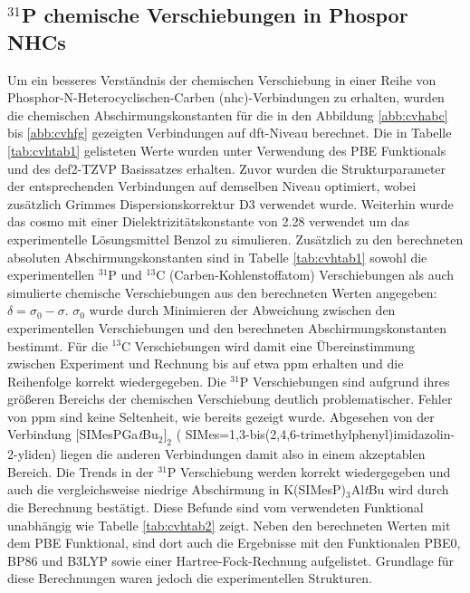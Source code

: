 \subsection{\texorpdfstring{$^{31}$P}{31P} chemische Verschiebungen in Phospor NHCs}
Um ein besseres Verständnis der chemischen Verschiebung in einer Reihe von Phosphor-N-Heterocyclischen-Carben (\acs{nhc})-Verbindungen \supercite{lemp2017nhc} zu erhalten, wurden die chemischen Abschirmungskonstanten für die in den Abbildung \ref{abb:cvhabc} bis \ref{abb:cvhfg} gezeigten Verbindungen auf \ac{dft}-Niveau berechnet. Die in Tabelle \ref{tab:cvhtab1} gelisteten Werte wurden unter Verwendung des PBE Funktionals\supercite{perdew1996generalized} und des def2-TZVP Basissatzes\supercite{weigend2005balanced} erhalten. Zuvor wurden die Strukturparameter der entsprechenden Verbindungen auf demselben Niveau optimiert, wobei zusätzlich Grimmes Dispersionskorrektur D3\supercite{grimme2010consistent,grimme2011effect} verwendet wurde. Weiterhin wurde das \ac{cosmo}\supercite{klamt1993cosmo} mit einer Dielektrizitätskonstante von 2.28 verwendet um das experimentelle Lösungsmittel Benzol zu simulieren. Zusätzlich zu den berechneten absoluten Abschirmungskonstanten sind in Tabelle \ref{tab:cvhtab1} sowohl die experimentellen $^{31}$P und $^{13}$C (Carben-Kohlenstoffatom) Verschiebungen als auch simulierte chemische Verschiebungen aus den berechneten Werten angegeben: $\delta=\sigma_0-\sigma$. $\sigma_0$ wurde durch Minimieren der Abweichung zwischen den experimentellen Verschiebungen und den berechneten Abschirmungskonstanten bestimmt. Für die $^{13}$C Verschiebungen wird damit eine Übereinstimmung zwischen Experiment und Rechnung bis auf etwa \unit[2]{ppm} erhalten und die Reihenfolge korrekt wiedergegeben. Die $^{31}$P Verschiebungen sind aufgrund ihres größeren Bereichs der chemischen Verschiebung deutlich problematischer. Fehler von \unit[30]{ppm} sind keine Seltenheit, wie bereits gezeigt wurde.\supercite{latypov2015quantum,reiter2017calculation} Abgesehen von der Verbindung $[$SIMesPGa\textit{t}Bu$_2]_2$ ( SIMes=1,3-bis(2,4,6-tri\-me\-thyl\-phe\-nyl)imi\-da\-zo\-lin-2-yli\-den) liegen die anderen Verbindungen damit also in einem akzeptablen Bereich. Die Trends in der $^{31}$P Verschiebung werden korrekt wiedergegeben und auch die vergleichsweise niedrige Abschirmung in K(SIMesP)$_3$Al\textit{t}Bu wird durch die Berechnung bestätigt. Diese Befunde sind vom verwendeten Funktional unabhängig wie Tabelle \ref{tab:cvhtab2} zeigt. Neben den berechneten Werten mit dem PBE Funktional, sind dort auch die Ergebnisse mit den Funktionalen PBE0\supercite{adamo1999toward}, BP86\supercite{perdew1986density,becke1988density} und B3LYP\supercite{becke1993density,lee1988development,stephens1994ab} sowie einer Hartree-Fock-Rechnung aufgelistet. Grundlage für diese Berechnungen waren jedoch die experimentellen Strukturen.

